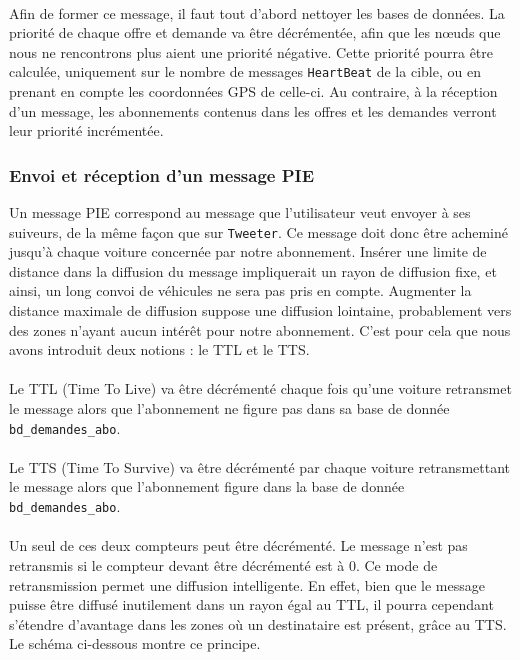 \paragraph*{}
Afin de former ce message, il faut tout d'abord nettoyer les bases de données. La priorité de chaque offre et demande va être décrémentée, afin que les n\oe uds que nous ne rencontrons plus aient une priorité négative. Cette priorité pourra être calculée, uniquement sur le nombre de messages \texttt{HeartBeat} de la cible, ou en prenant en compte les coordonnées GPS de celle-ci. Au contraire, à la réception d'un message, les abonnements contenus dans les offres et les demandes verront leur priorité incrémentée.

\subsubsection{Envoi et réception d'un message PIE}
Un message PIE correspond au message que l'utilisateur veut envoyer à ses suiveurs, de la même façon que sur \texttt{Tweeter}. Ce message doit donc être acheminé jusqu'à chaque voiture concernée par notre abonnement. Insérer une limite de distance dans la diffusion du message impliquerait un rayon de diffusion fixe, et ainsi, un long convoi de véhicules ne sera pas pris en compte. Augmenter la distance maximale de diffusion suppose une diffusion lointaine, probablement vers des zones n'ayant aucun intérêt pour notre abonnement. C'est pour cela que nous avons introduit deux notions : le TTL et le TTS.

\paragraph*{}
Le TTL (Time To Live) va être décrémenté chaque fois qu'une voiture retransmet le message alors que l'abonnement ne figure pas dans sa base de donnée \texttt{bd\_demandes\_abo}.
\paragraph*{}
Le TTS (Time To Survive) va être décrémenté par chaque voiture retransmettant le message alors que l'abonnement figure dans la base de donnée \texttt{bd\_demandes\_abo}.
\paragraph*{}
Un seul de ces deux compteurs peut être décrémenté. Le message n'est pas retransmis si le compteur devant être décrémenté est à 0. Ce mode de retransmission permet une diffusion intelligente. En effet, bien que le message puisse être diffusé inutilement dans un rayon égal au TTL, il pourra cependant s'étendre d'avantage dans les zones où un destinataire est présent, grâce au TTS. Le schéma ci-dessous montre ce principe.

